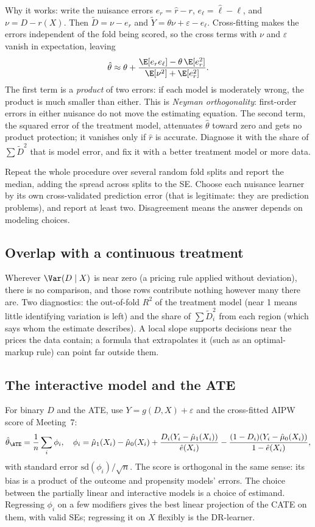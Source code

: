 \documentclass[11pt]{article}
\begin{document}
Why it works: write the nuisance errors $e_r = \hat r - r$, $e_\ell = \hat\ell - \ell$, and $\nu = D - r(X)$. Then
$\tilde D = \nu - e_r$ and $\tilde Y = \theta\nu + \varepsilon - e_\ell$. Cross-fitting makes the errors independent of the fold being
scored, so the cross terms with $\nu$ and $\varepsilon$ vanish in expectation, leaving
\[
  \hat\theta \approx \theta + \frac{\E[e_re_\ell] - \theta\,\E[e_r^2]}{\E[\nu^2] + \E[e_r^2]} .
\]
The first term is a \emph{product} of two errors: if each model is moderately wrong, the product is much smaller than either. This
is \emph{Neyman orthogonality}: first-order errors in either nuisance do not move the estimating equation. The second term, the
squared error of the treatment model, attenuates $\hat\theta$ toward zero and gets no product protection; it vanishes only if $\hat r$ is
accurate. Diagnose it with the share of $\sum\tilde D^2$ that is model error, and fix it with a better treatment model or more data.

Repeat the whole procedure over several random fold splits and report the median, adding the spread across splits to the SE. Choose
each nuisance learner by its own cross-validated prediction error (that is legitimate: they are prediction problems), and report at
least two. Disagreement means the answer depends on modeling choices.

\subsection{Overlap with a continuous treatment}

Wherever $\Var(D \mid X)$ is near zero (a pricing rule applied without deviation), there is no comparison, and those rows contribute
nothing however many there are. Two diagnostics: the out-of-fold $R^2$ of the treatment model (near 1 means little identifying
variation is left) and the share of $\sum\tilde D_i^2$ from each region (which says whom the estimate describes). A local slope supports
decisions near the prices the data contain; a formula that extrapolates it (such as an optimal-markup rule) can point far outside them.

\subsection{The interactive model and the ATE}

For binary $D$ and the ATE, use $Y = g(D, X) + \varepsilon$ and the cross-fitted AIPW score of Meeting~7:
\[
  \hat\theta_{\ATE} = \frac1n\sum_i\phi_i, \quad
  \phi_i = \hat\mu_1(X_i) - \hat\mu_0(X_i) + \frac{D_i(Y_i - \hat\mu_1(X_i))}{\hat e(X_i)} - \frac{(1-D_i)(Y_i - \hat\mu_0(X_i))}{1 - \hat e(X_i)},
\]
with standard error $\text{sd}(\phi_i)/\sqrt n$. The score is orthogonal in the same sense: its bias is a product of the outcome and
propensity models' errors. The choice between the partially linear and interactive models is a choice of estimand. Regressing $\phi_i$ on
a few modifiers gives the best linear projection of the CATE on them, with valid SEs; regressing it on $X$ flexibly is the DR-learner.
\end{document}
